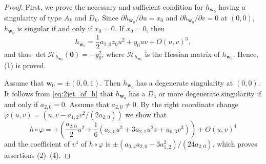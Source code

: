 \documentclass[12pt]{amsart}
\theoremstyle{plain}
\theoremstyle{definition}
\renewcommand{\phi}{\varphi}
\begin{document}
\begin{proof}
First, we prove the necessary and sufficient condition for $h_{\bm{w}_0}$ having a singularity of type $A_k$ and $D_k$. 
Since $\partial h_{\bm{w}_0}/\partial u = x_0$ and $\partial h_{\bm{w}_0}/\partial v = 0$ at $(0,0)$, $h_{\bm{w}_0}$ is singular if and only if $x_0 = 0$.
If $x_0 = 0$, then
\begin{equation}
\label{eq:2jet_of_h}
h_{\bm{w}_0} = \frac12 a_{2,0} z_0 u^2 + y_0 u v + O(u,v)^3,
\end{equation}
and thus $\det \mathcal{H}_{h_{\bm{w}_0}}(\bm{0}) = - y_0^2$, where $\mathcal{H}_{h_{\bm{w}_0}}$ is the Hessian matrix of $h_{\bm{w}_0}$. 
Hence, (1) is proved.

Assume that $\bm{w}_0 = \pm (0,0,1)$.
Then $h_{\bm{w}_0}$ has a degenerate singularity at $(0,0)$.
It follows from \eqref{eq:2jet_of_h} that $h_{\bm{w}_0}$  has a $D_4$ or more degenerate singularity if and only if $a_{2,0} = 0$.
Assume that $a_{2,0}\ne0$.
By the right coordinate change $\phi(u,v)=(u, v - a_{1,2}v^2/(2a_{2,0}))$ we show that 
\begin{equation*}
h \circ \phi = \pm\left(\dfrac{a_{2,0}}2 u^2 + \dfrac16(a_{3,0}u^2 + 3 a_{2,1} u^2 v + a_{0,3} v^3)\right) + O(u,v)^4
\end{equation*}
and the coefficient of $v^4$ of $h \circ \phi$ is $\pm (a_{0,4}a_{2,0} - 3a_{1,2}^2)/(24a_{2,0})$,  
which proves assertions (2)--(4).


\end{proof}
\end{document}
